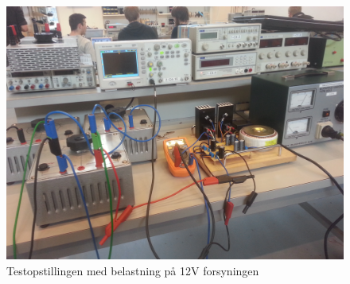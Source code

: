 \begin{figure}[H]
	\centering
	\includegraphics[scale=0.1]{../Hardware/PSU/Realisering/12VloadOpstilling}
	\caption{Testopstillingen med belastning på 12V forsyningen}
	\label{photo:12VloadOpstilling}
\end{figure}

